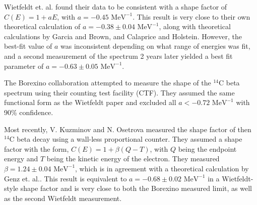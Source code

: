 Wietfeldt et. al. found their data to be consistent with a shape factor of $C(E)=1+aE$, with $a=-0.45 \text{ \ MeV}^{-1}$\cite{C14_Wietfeldt}. This result is very close to their own theoretical calculation of $a=-0.38 \pm 0.04 \text{ \ MeV}^{-1}$, along with theoretical calculations by Garcia and Brown\cite{C14_Garcia}, and  Calaprice and Holstein\cite{beta_Calaprice}. However, the best-fit value of $a$ was inconsistent depending on what range of energies was fit, and a second measurement of the spectrum 2 years later yielded a best fit parameter of $a=-0.63 \pm 0.05 \text{ \ MeV}^{-1}$. 

The Borexino collaboration attempted to measure the shape of the $^{14}$C beta spectrum using their counting test facility (CTF). They assumed the same functional form as the Wietfeldt paper and excluded all $a<-0.72 \text{ \ MeV}^{-1}$ with 90\% confidence\cite{C14_Borexino}. 


Most recently, V. Kuzminov and N. Osetrova measured the shape factor of then $^{14}$C beta decay using a wall-less proportional counter\cite{C14_Kuzminov}. They assumed a shape factor with the form, $C(E)=1+\beta(Q-T)$, with $Q$ being the endpoint energy and $T$ being the kinetic energy of the electron. They measured $\beta=1.24 \pm0.04 \text{ \ MeV}^{-1}$, which is in agreement with a theoretical calculation by Genz et. al.\cite{C14_Genz}. This result is equivalent to $a=-0.68 \pm0.02 \text{ \ MeV}^{-1}$ in a Wietfeldt-style shape factor and is very close to both the Borexino measured limit, as well as the second Wietfeldt measurement.

